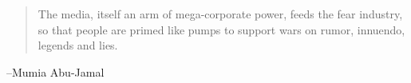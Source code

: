 \documentclass[letterpaper, landscape]{exam}
\begin{document}
  \else
    \vspace{10 cm}
    \begin{quote}
      \begin{em}
        The media, itself an arm of mega-corporate power, feeds the fear
        industry, so that people are primed like pumps to support wars on
        rumor, innuendo, legends and lies.
      \end{em}
    \end{quote}
    \hspace{2 cm} --Mumia Abu-Jamal
  \fi
\end{document}
